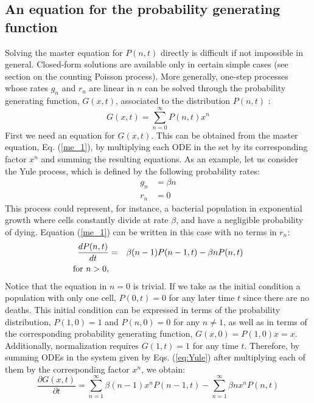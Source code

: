 \subsection{An equation for the probability generating function}
Solving the master equation for $P(n,t)$ directly is difficult if not impossible in general. Closed-form solutions are available only in certain simple cases (see section on the counting Poisson process). More generally, one-step processes whose rates $g_n$ and $r_n$ are linear in $n$ can be solved through the probability generating function, $G(x,t)$, associated to the distribution $P(n,t)$ \citep{Barlett60}:
\begin{equation}
G(x,t) = \sum_{n=0}^{\infty} P(n,t) x^n
\end{equation}
First we need an equation for $G(x,t)$. This can be obtained from the master equation, Eq. (\ref{me_1}), by multiplying each ODE in the set by its corresponding factor $x^n$ and summing the resulting equations. As an example, let us consider the Yule process, which is defined by the following probability rates:
\begin{align*}
g_n & = \beta n\\
r_n & = 0
\end{align*}
This process could represent, for instance, a bacterial population in exponential growth where cells constantly divide at rate $\beta$, and have a negligible probability of dying. Equation (\ref{me_1}) can be written in this case with no terms in $r_n$:    
\begin{eqnarray}
\frac{dP(n,t)}{dt}            & = & \beta (n-1) P(n-1,t) - \beta n P(n,t)         \nonumber \\
\textup{for} \,\, n > 0,      &   &                                               \label{eq:Yule}
\end{eqnarray}
Notice that the equation in $n=0$ is trivial. If we take as the initial condition a population with only one cell, $P(0,t) = 0$ for any later time $t$ since there are no deaths. This initial condition can be expressed in terms of the probability distribution, $P(1,0)=1$ and $P(n,0)=0$ for any $n \not = 1$, as well as in terms of the corresponding probability generating function, $G(x,0) = P(1,0) x = x$. Additionally, normalization requires $G(1,t) = 1$ for any time $t$. Therefore, by summing ODEs in the system given by Eqs. (\ref{eq:Yule}) after multiplying each of them by the corresponding factor $x^n$, we obtain:
\begin{equation}
\frac{\partial G(x,t)}{\partial t} = \sum_{n=1}^{\infty} \beta (n-1) x^n P(n-1,t) - \sum_{n=1}^{\infty} \beta n x^n P(n,t)
\end{equation}
